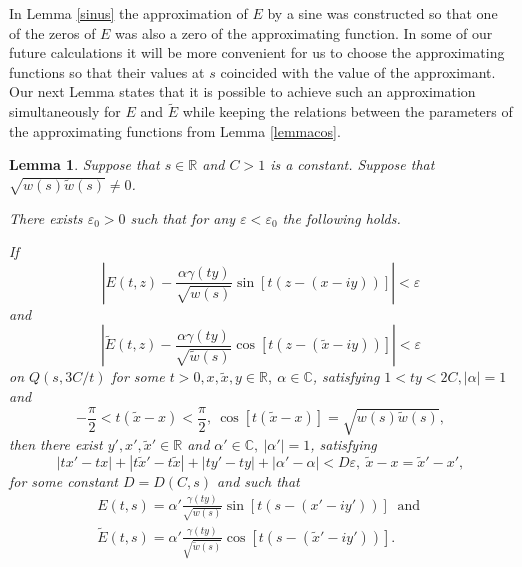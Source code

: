 \documentclass[11pt,twoside,reqno]{amsart}
\def\ti{\tilde}
\def\R{{\mathbb R}}
\def\C{{\mathbb{C}}}
\def\e{\varepsilon}
\def\g{\gamma}
\def\a{\alpha}
\theoremstyle{plain}
\newtheorem{lemma}{Lemma}
\numberwithin{equation}{section}
\begin{document}
In Lemma \ref{sinus} the  approximation of $E$  by a sine was constructed so that one of the zeros
of $E$  was also a zero of the approximating function.
In some of our future calculations it will be more convenient
for us to choose the approximating functions so that their values at $s$  coincided
with the value of the approximant. Our next Lemma states that it is possible to achieve such an approximation simultaneously for $E$ and $\ti E$ while keeping  the relations
between the parameters of the approximating functions from Lemma \ref{lemmacos}.


\begin{lemma}\label{cos} Suppose that $s\in \R$ and   $C>1$ is a constant. Suppose that  $\sqrt{w(s)\ti w(s)}\neq 0$.

There exists $\e_0>0$ such that for any $\e<\e_0$ the following holds.

If
$$\left|E(t,z) - \frac{\a\g(ty)}{\sqrt{w(s)}}\sin[t(z-(x -iy))]\right|<\e$$ and
$$\left|\ti E(t,z) -\frac{\a\g(ty)}{\sqrt{\ti w(s)}}\cos[t(z-(\ti x -iy))]\right|<\e$$
on $Q(s,3C/t)$ for some $t>0, x, \ti x, y \in \R, \ \a\in \C$, satisfying $ 1<ty<2C, |\a|=1$ and
\begin{equation}-\frac \pi 2< t(\ti x-x) < \frac \pi 2,\ \cos [t(\ti x-x)]=\sqrt{w(s)\ti w(s)},
\label{q-y}
\end{equation}
then
there exist $y', x ', \ti x '\in \R$ and $\a'\in\C, \ |\a'|=1$, satisfying
$$|tx '-tx |+|t\ti x '-t\ti x |+|ty'-ty|+|\a'-\a|<D \e,\ \ti x -x =\ti x '-x ',$$
for some  constant $D=D(C,s)$  and such that
\begin{equation}\begin{gathered}E(t,s) = \a'\frac{\g(ty)}{\sqrt{w(s)}}\sin[t(s-(x' -iy'))]\ \textrm{ and }\\ \ti E(t,s) = \a'\frac{\g(ty)}{\sqrt{\ti w(s)}}\cos[t(s-(\ti x' -iy'))].\label{eq1010}\end{gathered}\end{equation}

\end{lemma}
\end{document}
